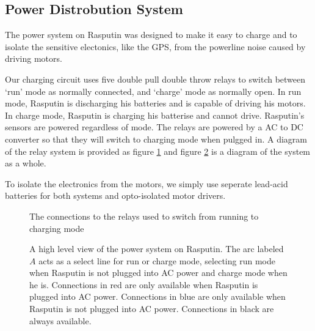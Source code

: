\documentclass[master.tex]{subfiles}
\begin{document}
\subsection{Power Distrobution System}
The power system on Rasputin was designed to make it easy to charge and to isolate the sensitive electonics, like the GPS, from the powerline noise caused by driving motors.

Our charging circuit uses five double pull double throw relays to switch between `run' mode as normally connected, and `charge' mode as normally open.
In run mode, Rasputin is discharging his batteries and is capable of driving his motors.
In charge mode, Rasputin is charging his batterise and cannot drive.
Rasputin's sensors are powered regardless of mode.
The relays are powered by a AC to DC converter so that they will switch to charging mode when pulgged in.
A diagram of the relay system is provided as figure \ref{relay-diagram} and figure \ref{power-distrobution-diagram} is a diagram of the system as a whole.

To isolate the electronics from the motors, we simply use seperate lead-acid batteries for both systems and opto-isolated motor drivers.
\begin{figure}
  
  \caption{The connections to the relays used to switch from running to charging mode}
  \label{relay-diagram}
\end{figure}
\begin{figure}
  
  \caption{A high level view of the power system on Rasputin.
    The arc labeled $A$ acts as a select line for run or charge mode, selecting run mode when Rasputin is not plugged into AC power and charge mode when he is.
    Connections in {\color{red} red} are only available when Rasputin is plugged into AC power.
    Connections in {\color{blue} blue} are only available when Rasputin is not plugged into AC power.
    Connections in black are always available.}
  \label{power-distrobution-diagram}
\end{figure}
\end{document}
